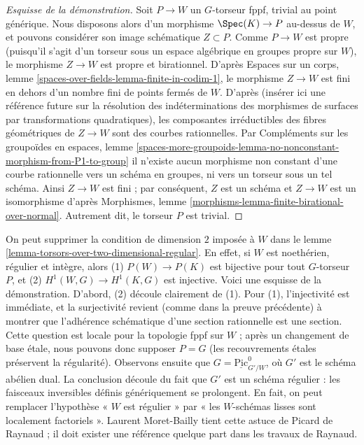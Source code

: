 \begin{proof}[Esquisse de la démonstration]
Soit $P \to W$ un $G$-torseur fppf, trivial au point générique.
Nous disposons alors d'un morphisme $\Spec(K) \to P$ au-dessus de $W$,
et pouvons considérer son image schématique $Z \subset P$. Comme $P \to W$
est propre (puisqu'il s'agit d'un torseur sous un espace algébrique en
groupes propre sur $W$), le morphisme $Z \to W$ est propre et birationnel.
D'après Espaces sur un corps, lemme \ref{spaces-over-fields-lemma-finite-in-codim-1}, le morphisme $Z \to W$
est fini en dehors d'un nombre fini de points fermés de $W$. D'après
(insérer ici une référence future sur la résolution des indéterminations
des morphismes de surfaces par transformations quadratiques),
les composantes irréductibles des fibres géométriques de $Z \to W$
sont des courbes rationnelles. Par
Compléments sur les groupoïdes en espaces, lemme
\ref{spaces-more-groupoids-lemma-no-nonconstant-morphism-from-P1-to-group}
il n'existe aucun morphisme non constant d'une courbe rationnelle
vers un schéma en groupes, ni vers un torseur sous un tel schéma.
Ainsi $Z \to W$ est fini ; par conséquent, $Z$ est un schéma et
$Z \to W$ est un isomorphisme d'après
Morphismes, lemme \ref{morphisms-lemma-finite-birational-over-normal}.
Autrement dit, le torseur $P$ est trivial.
\end{proof}

\begin{remark}
\label{remark-torsors-over-regular}
On peut supprimer la condition de dimension $2$ imposée à $W$ dans le
lemme \ref{lemma-torsors-over-two-dimensional-regular}. En effet, si $W$
est noethérien, régulier et intègre, alors
(1) $P(W)\to P(K)$ est bijective pour tout $G$-torseur $P$, et
(2) $H^1(W,G)\to H^1(K,G)$ est injective.
Voici une esquisse de la démonstration.
D'abord, (2) découle clairement de (1). Pour (1), l'injectivité est immédiate,
et la surjectivité revient (comme dans la preuve précédente) à montrer que
l'adhérence schématique d'une section rationnelle est une section.
Cette question est locale pour la topologie fppf sur $W$ ; après un changement
de base \'etale, nous pouvons donc supposer $P=G$ (les recouvrements \'etales
préservent la régularité). Observons ensuite que
$G=\underline{\mathrm{Pic}}^0_{G'/W}$, où $G'$ est le schéma abélien dual.
La conclusion découle du fait que $G'$ est un schéma régulier : les faisceaux
inversibles définis génériquement se prolongent. En fait, on peut remplacer
l'hypothèse « $W$ est régulier » par « les $W$-schémas lisses sont localement
factoriels ». Laurent Moret-Bailly tient cette astuce de Picard de Raynaud ;
il doit exister une référence quelque part dans les travaux de Raynaud.
\end{remark}

